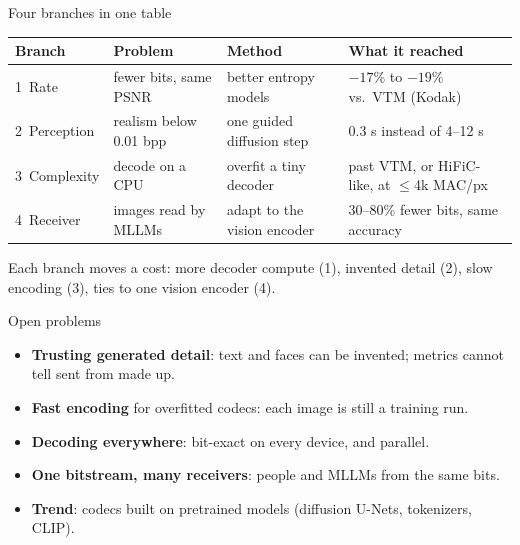\documentclass[aspectratio=169]{beamer}
\begin{document}
\begin{frame}{Four branches in one table}
  \begin{center}
  \footnotesize
  \begin{tabular}{llll}
    \toprule
    Branch & Problem & Method & What it reached \\
    \midrule
    \textcolor{sig}{1~Rate} & fewer bits, same PSNR & better entropy models & $-17\%$ to $-19\%$ vs.\ VTM (Kodak) \\
    \textcolor{accent}{2~Perception} & realism below 0.01 bpp & one guided diffusion step & 0.3 s instead of 4--12 s \\
    \textcolor{video}{3~Complexity} & decode on a CPU & overfit a tiny decoder & past VTM, or HiFiC-like, at $\le$4k MAC/px \\
    \textcolor{hot}{4~Receiver} & images read by MLLMs & adapt to the vision encoder & 30--80\% fewer bits, same accuracy \\
    \bottomrule
  \end{tabular}
  \end{center}
  \bigskip
  Each branch \alert{moves a cost}: more decoder compute (1), invented detail (2), slow encoding (3), ties to one vision encoder (4).
\end{frame}

\begin{frame}{Open problems}
  \begin{itemize}
    \item \textbf{Trusting generated detail}: text and faces can be invented; metrics cannot tell sent from made up.
    \item \textbf{Fast encoding} for overfitted codecs: each image is still a training run.
    \item \textbf{Decoding everywhere}: bit-exact on every device, and parallel.
    \item \textbf{One bitstream, many receivers}: people and MLLMs from the same bits.
    \item \textbf{Trend}: codecs built on pretrained models (diffusion U-Nets, tokenizers, CLIP).
  \end{itemize}
\end{frame}
\end{document}
